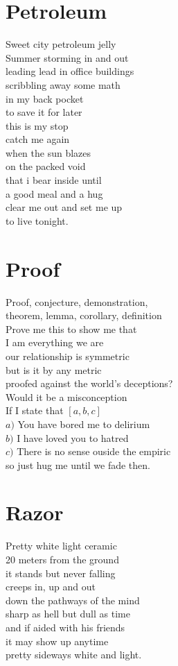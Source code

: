 \documentclass[a4paper,twoside, openany]{book}
\newenvironment{Verse}
  {\center\varwidth{\linewidth}\fontsize{18}{21.6}\selectfont}
  {\endvarwidth\endcenter}
\begin{document}
\chapter{Petroleum}
\begin{Verse}
Sweet city petroleum jelly\\
Summer storming in and out\\
leading lead in office buildings\\
scribbling away some math\\
in my back pocket\\
to save it for later\\
this is my stop\\
catch me again\\
when the sun blazes\\
on the packed void\\
that i bear inside until\\
a good meal and a hug\\
clear me out and set me up\\
to live tonight.
\end{Verse}
\chapter{Proof}
\begin{Verse}
Proof, conjecture, demonstration,\\
theorem, lemma, corollary, definition\\
Prove me this to show me that\\
I am everything we are\\
our relationship is symmetric\\
but is it by any metric\\
proofed against the world's deceptions?\\
Would it be a misconception\\
If I state that $[a,b,c]$\\
$a)$ You have bored me to delirium\\
$b)$ I have loved you to hatred\\
$c)$ There is no sense ouside the empiric\\
so just hug me until we fade then.
\end{Verse}
\chapter{Razor}
\begin{Verse}
Pretty white light ceramic\\
20 meters from the ground\\
it stands but never falling\\
creeps in, up and out\\
down the pathways of the mind\\
sharp as hell but dull as time\\
and if aided with his friends\\
it may show up anytime\\
pretty sideways white and light.
\end{Verse}
\end{document}
